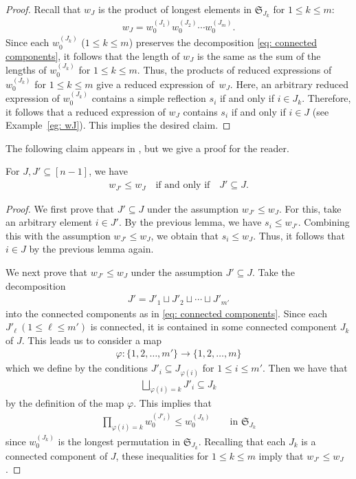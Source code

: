 \begin{proof}
Recall that $w_J$ is the product of longest elements in $\mathfrak{S}_{J_k}$ for $1\le k\le m$:
\begin{align*}
 w_J = w_0^{(J_1)} w_0^{(J_2)} \cdots w_0^{(J_{m})}.
\end{align*}
Since each $w_0^{(J_k)}$ ($1\le k\le m$) preserves the decomposition \eqref{eq: connected components}, it follows that the length of $w_J$ is the same as the sum of the lengths of $w_0^{(J_k)}$ for $1\le k\le m$. Thus, the products of reduced expressions of $w_0^{(J_k)}$ for $1\le k\le m$ give a reduced expression of~$w_J$. Here, an arbitrary reduced expression of $w_0^{(J_k)}$ contains a simple reflection $s_i$ if and only if $i\in J_k$. Therefore, it follows that a reduced expression of $w_J$ contains $s_i$ if and only if $i\in J$ (see Example~\ref{eg: wJ}). This implies the desired claim. 
\end{proof}

The following claim appears in \cite[Lemma 6]{Insko-Tymoczko}, but we give a proof for the reader.
\begin{lemma}\label{lem: So-san's lemma}
For $J,J'\subseteq[n-1]$, we have
\begin{align}\label{eq: subavr 15}
w_{J'} \le w_{J} \quad \text{if and only if} \quad J'\subseteq J .
\end{align}
\end{lemma}

\begin{proof}
We first prove that $J'\subseteq J$ under the assumption $w_{J'} \le w_{J}$. For this, take an arbitrary element $i\in J'$. By the previous lemma, we have $s_i\le w_{J'}$. Combining this with the assumption $w_{J'} \le w_{J}$, we obtain that $s_i\le w_{J}$. Thus, it follows that $i\in J$ by the previous lemma again. 

We next prove that $w_{J'} \le w_{J}$ under the assumption $J'\subseteq J$. Take the decomposition 
\begin{align*}
 J' = J'_1 \sqcup J'_2 \sqcup \cdots \sqcup J'_{m'}
\end{align*}
into the connected components as in \eqref{eq: connected components}. Since each $J'_{\ell}\ (1\le \ell \le m')$ is connected, it is contained in some connected component $J_k$ of $J$. This leads us to consider a map
\begin{align*}
 \varphi \colon \{1,2,\ldots,m'\} \rightarrow \{1,2,\ldots,m\}
\end{align*}
which we define by the conditions $J'_i\subseteq J_{\varphi(i)}$ for $1\le i\le m'$. Then we have that
\begin{align*}
 \bigsqcup_{\varphi(i)=k} J'_i \subseteq J_{k}
\end{align*}
by the definition of the map $\varphi$. This implies that 
\begin{align*}
 \prod_{\varphi(i)=k} w_0^{(J'_i)} \le w_0^{(J_k)}
 \qquad \text{in $\mathfrak{S}_{J_k}$}
\end{align*}
since $w_0^{(J_k)}$ is the longest permutation in $\mathfrak{S}_{J_k}$. Recalling that each $J_k$ is a connected component of $J$, these inequalities for $1\le k\le m$ imply that $w_{J'}\le w_{J}$.
\end{proof}

